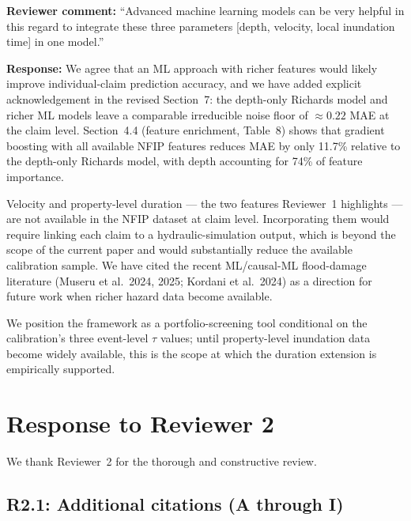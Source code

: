 \documentclass[11pt]{article}
\begin{document}
\textbf{Reviewer comment:} ``Advanced machine learning models can be very helpful in this regard to integrate these three parameters [depth, velocity, local inundation time] in one model.''

\textbf{Response:} We agree that an ML approach with richer features would likely improve individual-claim prediction accuracy, and we have added explicit acknowledgement in the revised Section~7: the depth-only Richards model and richer ML models leave a comparable irreducible noise floor of $\approx 0.22$ MAE at the claim level. Section~4.4 (feature enrichment, Table~8) shows that gradient boosting with all available NFIP features reduces MAE by only 11.7\% relative to the depth-only Richards model, with depth accounting for 74\% of feature importance.

Velocity and property-level duration --- the two features Reviewer~1 highlights --- are not available in the NFIP dataset at claim level. Incorporating them would require linking each claim to a hydraulic-simulation output, which is beyond the scope of the current paper and would substantially reduce the available calibration sample. We have cited the recent ML/causal-ML flood-damage literature (Museru et al.\ 2024, 2025; Kordani et al.\ 2024) as a direction for future work when richer hazard data become available.

We position the framework as a portfolio-screening tool conditional on the calibration's three event-level $\tau$ values; until property-level inundation data become widely available, this is the scope at which the duration extension is empirically supported.

\section*{Response to Reviewer 2}

We thank Reviewer~2 for the thorough and constructive review.

\subsection*{R2.1: Additional citations (A through I)}
\end{document}
